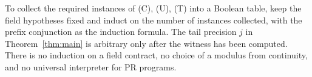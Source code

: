 To collect the required instances of (C), (U), (T) into a Boolean
table, keep the field hypotheses fixed and induct on the number of
instances collected, with the prefix conjunction as the induction
formula. The tail precision $j$ in Theorem~\ref{thm:main} is arbitrary
only after the witness has been computed. There is no induction on a
field contract, no choice of a modulus from continuity, and no
universal interpreter for PR programs.
